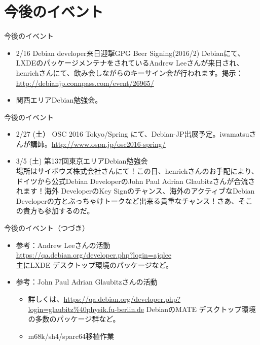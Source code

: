 \section{今後のイベント}
\begin{frame}{今後のイベント}
\begin{itemize}
\item 2/16 Debian developer来日迎撃GPG Beer Signing(2016/2)
 Debianにて、LXDEのパッケージメンテナをされているAndrew Leeさんが来日され、henrichさんにて、飲み会しながらのキーサイン会が行われます。掲示：\url{http://debianjp.connpass.com/event/26965/}
\item 関西エリアDebian勉強会。
\end{itemize}
\end{frame}

\begin{frame}{今後のイベント}
\begin{itemize}
\item 2/27 (土） OSC 2016 Tokyo/Spring にて、Debian-JP出展予定。iwamatsuさんが講師。\url{http://www.ospn.jp/osc2016-spring/}
\item 3/5 (土) 第137回東京エリアDebian勉強会\\
  場所はサイボウズ株式会社さんにて！この日、henrichさんのお手配により、ドイツから公式Debian DeveloperのJohn Paul Adrian Glaubitzさんが合流されます！海外 DeveloperのKey Signのチャンス、海外のアクティブなDebian Developerの方とぶっちゃけトークなど出来る貴重なチャンス！さあ、そこの貴方も参加するのだ。
\end{itemize}
\end{frame}

\begin{frame}{今後のイベント（つづき）}
\begin{itemize}
\item 参考：Andrew Leeさんの活動\\
   \url{https://qa.debian.org/developer.php?login=ajqlee}\\
    主にLXDE デスクトップ環境のパッケージなど。
\item 参考：John Paul Adrian Glaubitzさんの活動
  \begin{itemize}
  \item 詳しくは、\url{https://qa.debian.org/developer.php?login=glaubitz\%40physik.fu-berlin.de} DebianのMATE デスクトップ環境の多数のパッケージ群など。
  \item m68k/sh4/sparc64移植作業
  \end{itemize}
\end{itemize}
\end{frame}

